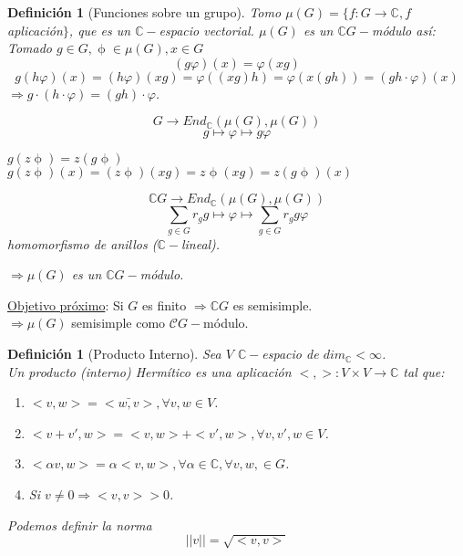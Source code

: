 \documentclass[11pt,a4paper]{article}
\theoremstyle{break}
\newtheorem{definition}[theorem]{Definición}
\begin{document}
\begin{definition}[Funciones sobre un grupo]
\vspace{0.5cm}

Tomo $\mu(G) = \{f : G \to \mathbb{C}, f$ aplicación$\}$, que es un $\mathbb{C}-$espacio vectorial. $\mu(G)$ es un $\mathbb{C}G-$módulo así: \\
Tomado $g \in G, \upphi \in \mu(G), x \in G$
$$(g \varphi)(x) = \varphi(xg)$$
$$g(h \varphi)(x) = (h \varphi)(xg) = \varphi((xg)h) = \varphi(x(gh)) = (gh \cdot \varphi)(x)$$
$\Rightarrow g \cdot (h \cdot \varphi) = (g h) \cdot \varphi$.

\vspace{0.5cm}

$$G \to End_{\mathbb{C}}(\mu(G), \mu(G))$$
$$g \mapsto \varphi \mapsto g \varphi$$ 

$g(z \upphi) = z(g \upphi)$ \\
$g(z \upphi)(x) = (z \upphi)(x g) = z \upphi(x g) = z(g \upphi)(x)$

$$\mathbb{C}G \to End_{\mathbb{C}}(\mu(G), \mu(G))$$
$$\sum_{g \in G} r_{g}{g} \mapsto \varphi \mapsto \sum_{g \in G} r_{g} g \varphi$$
homomorfismo de anillos ($\mathbb{C}-$lineal).

\vspace{0.5cm}

$\Rightarrow \mu(G)$ es un $\mathbb{C}G-$módulo.
\end{definition}

\underline{Objetivo próximo}: Si $G$ es finito $\Rightarrow \mathbb{C}G$ es semisimple. \\
$\Rightarrow \mu(G)$ semisimple como $\mathcal{C}G-$módulo.

\begin{definition}[Producto Interno]
Sea $V$ $\mathbb{C}-$espacio de $dim_{\mathbb{C}} < \infty$. \\
Un producto (interno) Hermítico es una aplicación $<, >: V \times V \to \mathbb{C}$ tal que:
\begin{enumerate}
\item $<v, w> = \bar{<w, v>}, \forall v, w \in V$.
\item $<v+v', w> = <v, w> + <v', w>, \forall v, v', w \in V$.
\item $<\alpha v, w> = \alpha<v, w>, \forall \alpha \in \mathbb{C}, \forall v, w, \in G$.
\item Si $v \neq 0 \Rightarrow <v, v> > 0$.
\end{enumerate}

Podemos definir la norma
$$||v|| = \sqrt{<v, v>}$$
\end{definition}
\end{document}
